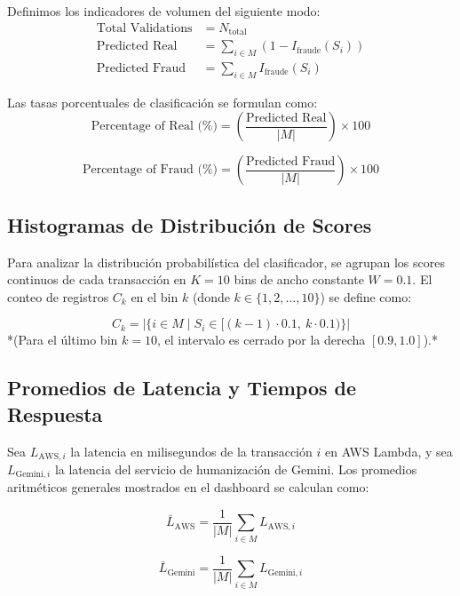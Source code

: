 Definimos los indicadores de volumen del siguiente modo:
\begin{align}
\text{Total Validations} &= N_{\text{total}} \\
\text{Predicted Real} &= \sum_{i \in M} (1 - I_{\text{fraude}}(S_i)) \\
\text{Predicted Fraud} &= \sum_{i \in M} I_{\text{fraude}}(S_i)
\end{align}

Las tasas porcentuales de clasificación se formulan como:
\begin{equation}
\text{Percentage of Real (\%)} = \left( \frac{\text{Predicted Real}}{|M|} \right) \times 100
\end{equation}

\begin{equation}
\text{Percentage of Fraud (\%)} = \left( \frac{\text{Predicted Fraud}}{|M|} \right) \times 100
\end{equation}

\subsection{Histogramas de Distribución de Scores}
Para analizar la distribución probabilística del clasificador, se agrupan los scores continuos de cada transacción en $K=10$ bins de ancho constante $W = 0.1$. El conteo de registros $C_k$ en el bin $k$ (donde $k \in \{1, 2, \dots, 10\}$) se define como:

\begin{equation}
C_k = |\{i \in M \mid S_i \in [ (k-1) \cdot 0.1, \ k \cdot 0.1 ) \}|
\end{equation}
*(Para el último bin $k=10$, el intervalo es cerrado por la derecha $[0.9, 1.0]$).*

\subsection{Promedios de Latencia y Tiempos de Respuesta}
Sea $L_{\text{AWS}, i}$ la latencia en milisegundos de la transacción $i$ en AWS Lambda, y sea $L_{\text{Gemini}, i}$ la latencia del servicio de humanización de Gemini. Los promedios aritméticos generales mostrados en el dashboard se calculan como:

\begin{equation}
\bar{L}_{\text{AWS}} = \frac{1}{|M|} \sum_{i \in M} L_{\text{AWS}, i}
\end{equation}

\begin{equation}
\bar{L}_{\text{Gemini}} = \frac{1}{|M|} \sum_{i \in M} L_{\text{Gemini}, i}
\end{equation}
